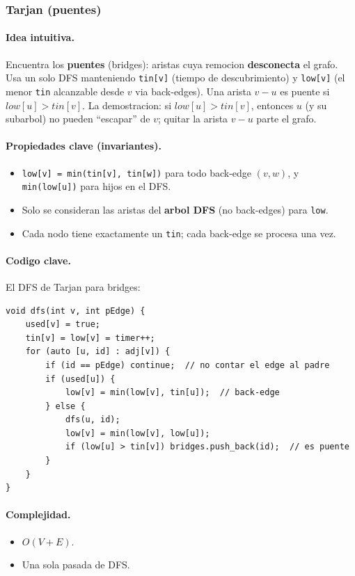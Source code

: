 ﻿\subsubsection{Tarjan (puentes)}

\paragraph{Idea intuitiva.}
Encuentra los \textbf{puentes} (bridges): aristas cuya remocion \textbf{desconecta} el grafo. Usa un solo DFS manteniendo \texttt{tin[v]} (tiempo de descubrimiento) y \texttt{low[v]} (el menor \texttt{tin} alcanzable desde $v$ via back-edges). Una arista $v - u$ es puente si $low[u] > tin[v]$. La demostracion: si $low[u] > tin[v]$, entonces $u$ (y su subarbol) no pueden ``escapar'' de $v$; quitar la arista $v - u$ parte el grafo.

\paragraph{Propiedades clave (invariantes).}
\begin{itemize}\setlength\itemsep{0pt}
	\item \texttt{low[v] = min(tin[v], tin[w])} para todo back-edge $(v, w)$, y \texttt{min(low[u])} para hijos en el DFS.
	\item Solo se consideran las aristas del \textbf{arbol DFS} (no back-edges) para \texttt{low}.
	\item Cada nodo tiene exactamente un \texttt{tin}; cada back-edge se procesa una vez.
\end{itemize}

\paragraph{Codigo clave.}
El DFS de Tarjan para bridges:
\begin{verbatim}
void dfs(int v, int pEdge) {
    used[v] = true;
    tin[v] = low[v] = timer++;
    for (auto [u, id] : adj[v]) {
        if (id == pEdge) continue;  // no contar el edge al padre
        if (used[u]) {
            low[v] = min(low[v], tin[u]);  // back-edge
        } else {
            dfs(u, id);
            low[v] = min(low[v], low[u]);
            if (low[u] > tin[v]) bridges.push_back(id);  // es puente
        }
    }
}
\end{verbatim}

\paragraph{Complejidad.}
\begin{itemize}\setlength\itemsep{0pt}
	\item $O(V + E)$.
	\item Una sola pasada de DFS.
\end{itemize}


